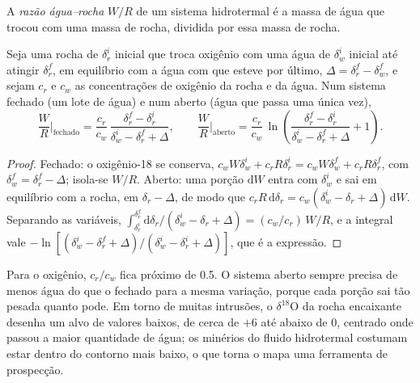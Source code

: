 \begin{definition}\label{def:b3:water-rock-interaction:water-rock-ratio}
A \emph{razão água--rocha} $W/R$ de um
sistema hidrotermal é a massa de água que trocou com uma massa de
rocha, dividida por essa massa de rocha.
\end{definition}

\begin{proposition}\label{prop:b3:water-rock-interaction:wr}
Seja uma rocha de $\delta_r^i$ inicial que troca oxigênio com uma água de
$\delta_w^i$ inicial até atingir $\delta_r^f$, em equilíbrio com a água com que
esteve por último, $\Delta = \delta_r^f - \delta_w^f$, e sejam $c_r$ e $c_w$
as concentrações de oxigênio da rocha e da água. Num sistema fechado (um lote de
água) e num aberto (água que passa uma única vez),
\[
\frac WR\Big|_{\text{fechado}} = \frac{c_r}{c_w}\,
\frac{\delta_r^f - \delta_r^i}{\delta_w^i - \delta_r^f + \Delta},
\qquad
\frac WR\Big|_{\text{aberto}} = \frac{c_r}{c_w}\,
\ln\!\left(\frac{\delta_r^f - \delta_r^i}{\delta_w^i - \delta_r^f + \Delta} + 1\right).
\]
\end{proposition}

\begin{proof}
Fechado: o oxigênio-18 se conserva, $c_wW\delta_w^i + c_rR\delta_r^i = c_wW
\delta_w^f + c_rR\delta_r^f$, com $\delta_w^f = \delta_r^f - \Delta$; isola-se
$W/R$. Aberto: uma porção $\mathrm dW$ entra com $\delta_w^i$ e sai em
equilíbrio com a rocha, em $\delta_r - \Delta$, de modo que $c_rR\,\mathrm d\delta_r
= c_w(\delta_w^i - \delta_r + \Delta)\,\mathrm dW$. Separando as variáveis,
$\int_{\delta_r^i}^{\delta_r^f}\mathrm d\delta_r/(\delta_w^i - \delta_r +
\Delta) = (c_w/c_r)\,W/R$, e a integral vale $-\ln[(\delta_w^i - \delta_r^f
+ \Delta)/(\delta_w^i - \delta_r^i + \Delta)]$, que é a expressão.
\end{proof}

Para o oxigênio, $c_r/c_w$ fica próximo de 0.5. O sistema aberto sempre precisa
de menos água do que o fechado para a mesma variação, porque cada porção sai
tão pesada quanto pode. Em torno de muitas intrusões, o $\delta^{18}\mathrm O$
da rocha encaixante desenha um alvo de valores baixos, de cerca de $+6$ até
abaixo de 0, centrado onde passou a maior quantidade de água; os minérios do
fluido hidrotermal costumam estar dentro do contorno mais baixo, o que torna o
mapa uma ferramenta de prospecção.

